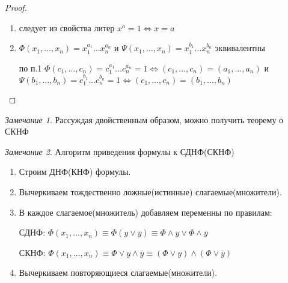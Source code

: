 \documentclass[a4paper]{article}
\theoremstyle{definition}
\theoremstyle{remark}
\newtheorem*{remark}{Замечание}
\begin{document}
    \begin{proof}
        \begin{enumerate}
            \item следует из свойства литер $x^a =1\Leftrightarrow x = a$
            \item $\Phi(x_1, \dots, x_n) = x_1^{a_1}\dots x_n^{a_n}$ и $\Psi(x_1, \dots, x_n) = x_1^{b_1}\dots x_n^{b_n}$ эквивалентны
            
            по п.1 $\Phi(c_1, \dots, c_n) = c_1^{a_1}\dots c_n^{a_n} = 1 \Leftrightarrow (c_1, \dots , c_n) = (a_1, \dots, a_n)$ и
            $\Psi(b_1, \dots, b_n) = c_1^{b_1}\dots c_n^{b_n} = 1 \Leftrightarrow (c_1, \dots , c_n) = (b_1, \dots, b_n)$
        \end{enumerate}
    \end{proof}
	\begin{remark}
		Рассуждая двойственным образом, можно получить теорему о СКНФ
	\end{remark}
	\begin{remark}
		Алгоритм приведения формулы к СДНФ(СКНФ)
		\begin{enumerate}
			\item Строим ДНФ(КНФ) формулы.
			\item Вычеркиваем тождественно ложные(истинные) слагаемые(множители).
			\item В каждое слагаемое(множитель) добавляем переменны по правилам:

				СДНФ: $\Phi(x_1, \dots , x_n) \equiv \Phi(y \vee \overline{y}) \equiv \Phi \wedge y \vee \Phi \wedge \overline{y}$
				
				СКНФ: $\Phi(x_1, \dots , x_n) \equiv \Phi \vee y \wedge \overline{y} \equiv (\Phi \vee y) \wedge (\Phi \vee \overline{y})$
			\item Вычеркиваем повторяющиеся слагаемые(множители).
		\end{enumerate}
	\end{remark}
\end{document}
